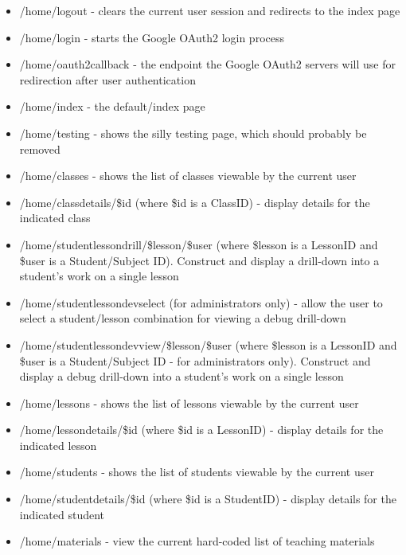 \documentclass[letterpaper,10pt]{article}
\begin{document}
\begin{itemize}
    \item /home/logout - clears the current user session and redirects to the index page
    \item /home/login - starts the Google OAuth2 login process
    \item /home/oauth2callback - the endpoint the Google OAuth2 servers will use for
          redirection after user authentication
    
    \item /home/index - the default/index page
    
    \item /home/testing - shows the silly testing page, which should probably be removed
    
    \item /home/classes - shows the list of classes viewable by the current user
    
    \item /home/classdetails/\$id (where \$id is a ClassID) - display details for the
          indicated class
    
    \item /home/studentlessondrill/\$lesson/\$user (where \$lesson is a LessonID and \$user is a
          Student/Subject ID).  Construct and display a drill-down into a student's work on
          a single lesson
    
    \item /home/studentlessondevselect (for administrators only) - allow the user to select 
          a student/lesson combination for viewing a debug drill-down
    
    \item /home/studentlessondevview/\$lesson/\$user (where \$lesson is a LessonID and \$user is a
          Student/Subject ID - for administrators only).  Construct and display a debug
          drill-down into a student's work on a single lesson
    
    \item /home/lessons - shows the list of lessons viewable by the current user
    
    \item /home/lessondetails/\$id (where \$id is a LessonID) - display details for the
          indicated lesson
          
    \item /home/students - shows the list of students viewable by the current user
    
    \item /home/studentdetails/\$id (where \$id is a StudentID) - display details for the
          indicated student
    
    \item /home/materials - view the current hard-coded list of teaching materials
\end{itemize}
\end{document}
